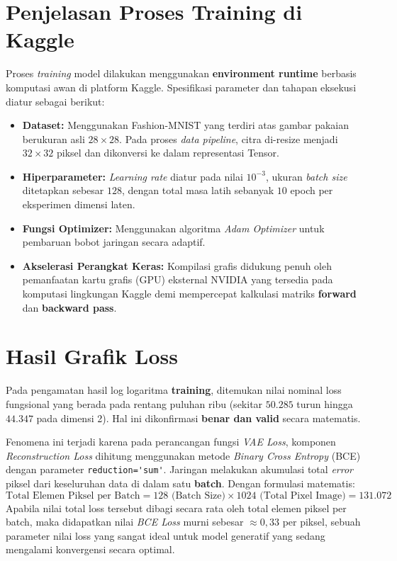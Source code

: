 \documentclass[12pt,titlepage]{article}
\begin{document}
\section{Penjelasan Proses Training di Kaggle}
Proses \textit{training} model dilakukan menggunakan \textbf{environment runtime} berbasis komputasi awan di platform Kaggle. Spesifikasi parameter dan tahapan eksekusi diatur sebagai berikut:
\begin{itemize}
	\item \textbf{Dataset:} Menggunakan Fashion-MNIST yang terdiri atas gambar pakaian berukuran asli $28 \times 28$. Pada proses \textit{data pipeline}, citra di-resize menjadi $32 \times 32$ piksel dan dikonversi ke dalam representasi Tensor.
	\item \textbf{Hiperparameter:} \textit{Learning rate} diatur pada nilai $10^{-3}$, ukuran \textit{batch size} ditetapkan sebesar $128$, dengan total masa latih sebanyak $10$ epoch per eksperimen dimensi laten.
	\item \textbf{Fungsi Optimizer:} Menggunakan algoritma \textit{Adam Optimizer} untuk pembaruan bobot jaringan secara adaptif.
	\item \textbf{Akselerasi Perangkat Keras:} Kompilasi grafis didukung penuh oleh pemanfaatan kartu grafis (GPU) eksternal NVIDIA yang tersedia pada komputasi lingkungan Kaggle demi mempercepat kalkulasi matriks \textbf{forward} dan \textbf{backward pass}.
\end{itemize}

\section{Hasil Grafik Loss}
Pada pengamatan hasil log logaritma \textbf{training}, ditemukan nilai nominal loss fungsional yang berada pada rentang puluhan ribu (sekitar $50.285$ turun hingga $44.347$ pada dimensi 2). Hal ini dikonfirmasi \textbf{benar dan valid} secara matematis.

Fenomena ini terjadi karena pada perancangan fungsi \textit{VAE Loss}, komponen \textit{Reconstruction Loss} dihitung menggunakan metode \textit{Binary Cross Entropy} (BCE) dengan parameter \lstinline|reduction='sum'|. Jaringan melakukan akumulasi total \textit{error} piksel dari keseluruhan data di dalam satu \textbf{batch}. Dengan formulasi matematis:
\begin{equation}
	\text{Total Elemen Piksel per Batch} = 128 \text{ (Batch Size)} \times 1024 \text{ (Total Pixel Image)} = 131.072
\end{equation}
Apabila nilai total loss tersebut dibagi secara rata oleh total elemen piksel per batch, maka didapatkan nilai \textit{BCE Loss} murni sebesar $\approx 0,33$ per piksel, sebuah parameter nilai loss yang sangat ideal untuk model generatif yang sedang mengalami konvergensi secara optimal.
\end{document}
